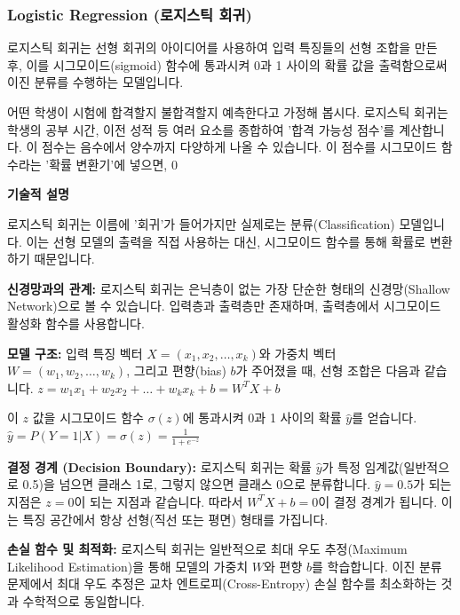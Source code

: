 \documentclass[11pt,a4paper]{article}
\theoremstyle{definition}
\begin{document}
\subsubsection{Logistic Regression (로지스틱 회귀)}

\begin{summarybox}[title={한 줄 핵심 요약}]
로지스틱 회귀는 선형 회귀의 아이디어를 사용하여 입력 특징들의 선형 조합을 만든 후, 이를 시그모이드(sigmoid) 함수에 통과시켜 0과 1 사이의 확률 값을 출력함으로써 이진 분류를 수행하는 모델입니다.
\end{summarybox}

\begin{examplebox}[title={직관적 예시/비유}]
어떤 학생이 시험에 합격할지 불합격할지 예측한다고 가정해 봅시다. 로지스틱 회귀는 학생의 공부 시간, 이전 성적 등 여러 요소를 종합하여 '합격 가능성 점수'를 계산합니다. 이 점수는 음수에서 양수까지 다양하게 나올 수 있습니다. 이 점수를 시그모이드 함수라는 '확률 변환기'에 넣으면, 0%
\end{examplebox}

\textbf{기술적 설명}

로지스틱 회귀는 이름에 '회귀'가 들어가지만 실제로는 분류(Classification) 모델입니다. 이는 선형 모델의 출력을 직접 사용하는 대신, 시그모이드 함수를 통해 확률로 변환하기 때문입니다.

\textbf{신경망과의 관계:}
로지스틱 회귀는 은닉층이 없는 가장 단순한 형태의 신경망(Shallow Network)으로 볼 수 있습니다. 입력층과 출력층만 존재하며, 출력층에서 시그모이드 활성화 함수를 사용합니다.

\textbf{모델 구조:}
입력 특징 벡터 $X = (x_1, x_2, \dots, x_k)$와 가중치 벡터 $W = (w_1, w_2, \dots, w_k)$, 그리고 편향(bias) $b$가 주어졌을 때, 선형 조합은 다음과 같습니다.
$z = w_1 x_1 + w_2 x_2 + \dots + w_k x_k + b = W^T X + b$

이 $z$ 값을 시그모이드 함수 $\sigma(z)$에 통과시켜 0과 1 사이의 확률 $\hat{y}$를 얻습니다.
$\hat{y} = P(Y=1|X) = \sigma(z) = \frac{1}{1 + e^{-z}}$

\textbf{결정 경계 (Decision Boundary):}
로지스틱 회귀는 확률 $\hat{y}$가 특정 임계값(일반적으로 0.5)을 넘으면 클래스 1로, 그렇지 않으면 클래스 0으로 분류합니다. $\hat{y} = 0.5$가 되는 지점은 $z = 0$이 되는 지점과 같습니다. 따라서 $W^T X + b = 0$이 결정 경계가 됩니다. 이는 특징 공간에서 항상 선형(직선 또는 평면) 형태를 가집니다.

\textbf{손실 함수 및 최적화:}
로지스틱 회귀는 일반적으로 최대 우도 추정(Maximum Likelihood Estimation)을 통해 모델의 가중치 $W$와 편향 $b$를 학습합니다. 이진 분류 문제에서 최대 우도 추정은 교차 엔트로피(Cross-Entropy) 손실 함수를 최소화하는 것과 수학적으로 동일합니다.
\end{document}
